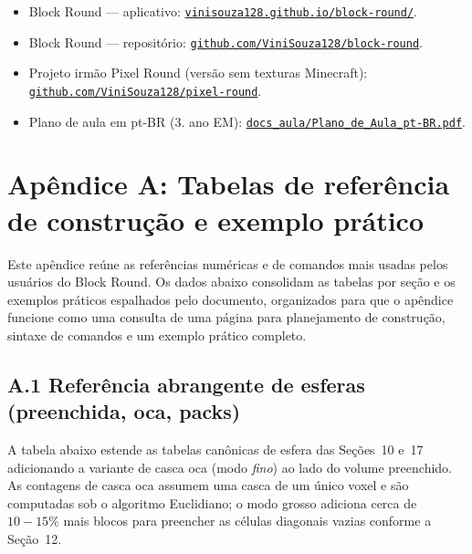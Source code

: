 \documentclass[12pt,a4paper]{scrartcl}
\newcommand{\biblink}[2]{\href{#1}{\nolinkurl{#2}}}
\begin{document}
\begin{itemize}[leftmargin=1.4em,itemsep=0.3em,topsep=0.3em]
  \item Block Round --- aplicativo: \biblink{https://vinisouza128.github.io/block-round/}{vinisouza128.github.io/block-round/}.
  \item Block Round --- repositório: \biblink{https://github.com/ViniSouza128/block-round}{github.com/ViniSouza128/block-round}.
  \item Projeto irmão Pixel Round (versão sem texturas Minecraft):
        \biblink{https://github.com/ViniSouza128/pixel-round}{github.com/ViniSouza128/pixel-round}.
  \item Plano de aula em pt-BR (3.\textordmasculine{} ano EM):
        \biblink{https://vinisouza128.github.io/block-round/docs_aula/Plano_de_Aula_pt-BR.pdf}{docs\_aula/Plano\_de\_Aula\_pt-BR.pdf}.
\end{itemize}


\clearpage

\section*{\color{accent}Apêndice A: Tabelas de referência de construção e exemplo prático}

Este apêndice reúne as referências numéricas e de comandos mais usadas pelos usuários do Block Round. Os dados abaixo consolidam as tabelas por seção e os exemplos práticos espalhados pelo documento, organizados para que o apêndice funcione como uma consulta de uma página para planejamento de construção, sintaxe de comandos e um exemplo prático completo.

\subsection*{A.1 Referência abrangente de esferas (preenchida, oca, packs)}
A tabela abaixo estende as tabelas canônicas de esfera das Seções~10 e~17 adicionando a variante de casca oca (modo \emph{fino}) ao lado do volume preenchido. As contagens de casca oca assumem uma casca de um único voxel e são computadas sob o algoritmo Euclidiano; o modo grosso adiciona cerca de $10{-}15\%$ mais blocos para preencher as células diagonais vazias conforme a Seção~12.
\end{document}
